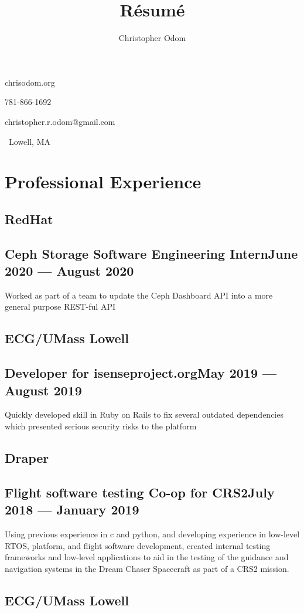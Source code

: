 \documentclass[11pt]{article}
\makeatletter
\newcommand\textbox[1]{%
	\parbox{.333\textwidth}{#1}%
}
\renewcommand{\maketitle}
{
	\begin{center}\huge \theauthor\end{center}
	{\large\noindent\textbox{chrisodom.org\hfill}\textbox{\hfill}\textbox{\hfill781-866-1692}}

	{\large\noindent\textbox{christopher.r.odom@gmail.com\hfill}\textbox{\hfill}\textbox{\hfill\ Lowell, MA}}
}
\makeatother
\begin{document}


\title{R\'esum\'e}
\author{Christopher Odom}

\maketitle

\section{Professional Experience}

\subsection{RedHat}
\subsection{Ceph Storage Software Engineering Intern\dotfill June 2020 --- August 2020}
Worked as part of a team to update the Ceph Dashboard
API into a more general purpose REST-ful API

\subsection{ECG/UMass Lowell}
\subsection{Developer for isenseproject.org\dotfill May 2019 --- August 2019}
Quickly developed skill in Ruby on Rails to fix several outdated dependencies
which presented serious security risks to the platform

\subsection{Draper}
\subsection{Flight software testing Co-op for CRS2\dotfill July 2018 --- January 2019}
Using previous experience in c and python, and developing experience in low-level
RTOS, platform, and flight software development,
created internal testing frameworks and 
low-level applications to aid in the testing of the
guidance and navigation systems in the Dream Chaser
Spacecraft as part of a CRS2 mission.

\subsection{ECG/UMass Lowell}
\end{document}
